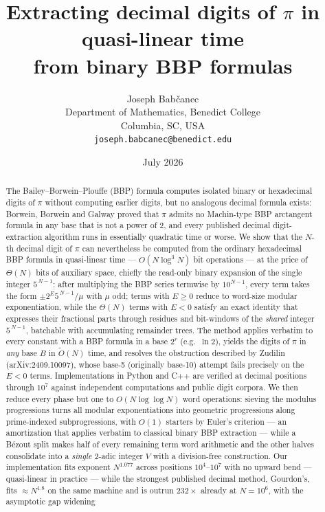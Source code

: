 \documentclass[11pt]{article}
\title{Extracting decimal digits of $\pi$ in quasi-linear time\\ from binary BBP formulas}
\author{Joseph Bab\v{c}anec\\
  \small Department of Mathematics, Benedict College\\
  \small Columbia, SC, USA\\
  \small \texttt{joseph.babcanec@benedict.edu}}
\date{July 2026}
\theoremstyle{remark}
\theoremstyle{definition}
\newcommand{\Ot}{\widetilde{O}}
\begin{document}
\maketitle

\begin{abstract}
The Bailey--Borwein--Plouffe (BBP) formula computes isolated binary or
hexadecimal digits of $\pi$ without computing earlier digits, but no
analogous decimal formula exists: Borwein, Borwein and Galway proved that
$\pi$ admits no Machin-type BBP arctangent formula in any base that is not
a power of $2$, and every published decimal digit-extraction algorithm
runs in essentially quadratic time or worse. We show that the $N$-th decimal digit of
$\pi$ can nevertheless be computed from the ordinary hexadecimal BBP
formula in quasi-linear time --- $O(N\log^{3}N)$ bit operations --- at the
price of $\Theta(N)$ bits of auxiliary space, chiefly the read-only binary
expansion of the single integer $5^{\,N-1}$: after multiplying the BBP
series termwise by $10^{N-1}$, every term takes the form
$\pm2^{E}5^{\,N-1}/\mu$ with $\mu$ odd; terms with $E\ge0$ reduce to
word-size modular exponentiation, while the $\Theta(N)$ terms with $E<0$
satisfy an exact identity that expresses their fractional parts through
residues and bit-windows of the \emph{shared} integer $5^{\,N-1}$,
batchable with accumulating remainder trees. The method applies verbatim
to every constant with a BBP formula in a base $2^{r}$ (e.g.\ $\ln2$),
yields the digits of $\pi$ in \emph{any} base $B$ in $\Ot(N)$ time, and
resolves the obstruction described by Zudilin (arXiv:2409.10097), whose
base-5 (originally base-10) attempt fails precisely on the $E<0$ terms.
Implementations in Python and C++ are verified at decimal positions
through $10^{7}$ against independent computations and public digit
corpora. We then reduce every phase but one to $O(N\log\log N)$ word
operations: sieving the modulus progressions turns all modular
exponentiations into geometric progressions along prime-indexed
subprogressions, with $O(1)$ starters by Euler's criterion --- an
amortization that applies verbatim to classical binary BBP extraction ---
while a B\'ezout split makes half of every remaining term word arithmetic
and the other halves consolidate into a \emph{single} $2$-adic integer
$V$ with a division-free construction. Our implementation fits exponent
$N^{1.077}$ across positions $10^{4}$--$10^{7}$ with no upward bend ---
quasi-linear in practice --- while the strongest published decimal
method, Gourdon's, fits $\approx N^{1.8}$ on the same machine and is
outrun $232\times$ already at $N=10^{6}$, with the asymptotic gap widening

\end{abstract}
\end{document}
